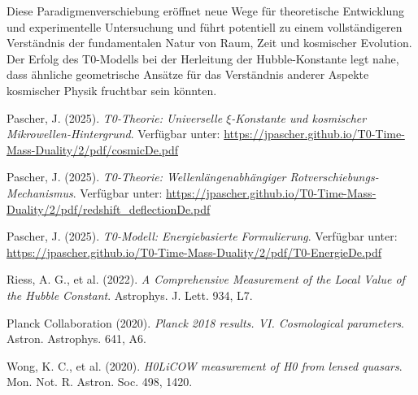 \documentclass[12pt,a4paper]{article}
\begin{document}
	Diese Paradigmenverschiebung eröffnet neue Wege für theoretische Entwicklung und experimentelle Untersuchung und führt potentiell zu einem vollständigeren Verständnis der fundamentalen Natur von Raum, Zeit und kosmischer Evolution. Der Erfolg des T0-Modells bei der Herleitung der Hubble-Konstante legt nahe, dass ähnliche geometrische Ansätze für das Verständnis anderer Aspekte kosmischer Physik fruchtbar sein könnten.
	
	\begin{thebibliography}{99}
		
		Pascher, J. (2025). \textit{T0-Theorie: Universelle $\xi$-Konstante und kosmischer Mikrowellen-Hintergrund}. Verfügbar unter: \url{https://jpascher.github.io/T0-Time-Mass-Duality/2/pdf/cosmicDe.pdf}
		
		Pascher, J. (2025). \textit{T0-Theorie: Wellenlängenabhängiger Rotverschiebungs-Mechanismus}. Verfügbar unter: \url{https://jpascher.github.io/T0-Time-Mass-Duality/2/pdf/redshift_deflectionDe.pdf}
		
		Pascher, J. (2025). \textit{T0-Modell: Energiebasierte Formulierung}. Verfügbar unter: \url{https://jpascher.github.io/T0-Time-Mass-Duality/2/pdf/T0-EnergieDe.pdf}
		
		Riess, A. G., et al. (2022). \textit{A Comprehensive Measurement of the Local Value of the Hubble Constant}. Astrophys. J. Lett. 934, L7.
		
		Planck Collaboration (2020). \textit{Planck 2018 results. VI. Cosmological parameters}. Astron. Astrophys. 641, A6.
		
		Wong, K. C., et al. (2020). \textit{H0LiCOW measurement of H0 from lensed quasars}. Mon. Not. R. Astron. Soc. 498, 1420.
		
	\end{thebibliography}
	
\end{document}
